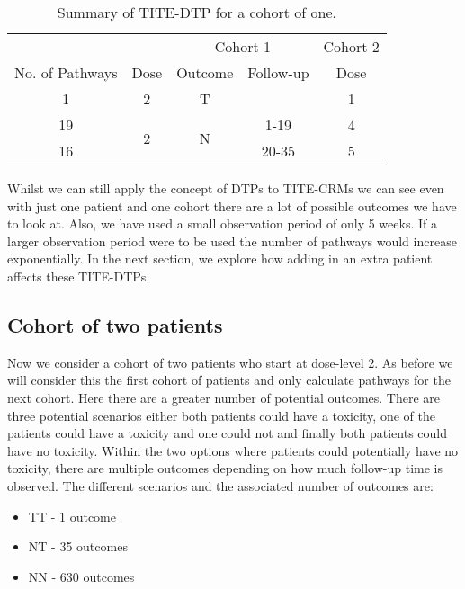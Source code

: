 \begin{table}[H]
	\centering
	\caption{Summary of TITE-DTP for a cohort of one.}
	\label{tab_tite-dtp:TITEDTP_c1_Sum}
	\begin{tabular}{ccccc}
		\hline
		\multicolumn{1}{l}{} &                 & \multicolumn{2}{c}{Cohort 1}   & Cohort 2 \\ 
		\cmidrule(l{3pt}r{3pt}){3-4} \cmidrule(l{3pt}r{3pt}){5-5}
		No. of Pathways & Dose                 & Outcome            & Follow-up & Dose     \\ \hline
		1				&  2                   & T                  &           & 1        \\ \hline
		19				&  \multirow{2}{*}{2}  & \multirow{2}{*}{N} & 1-19      & 4        \\
		16				&	 				   &                    & 20-35     & 5        \\ \hline
	\end{tabular}
\end{table}

Whilst we can still apply the concept of DTPs to TITE-CRMs we can see even with just one patient and one cohort there are a lot of possible outcomes we have to look at. Also, we have used a small observation period of only 5 weeks. If a larger observation period were to be used the number of pathways would increase exponentially. In the next section, we explore how adding in an extra patient affects these TITE-DTPs.  


\subsection{Cohort of two patients}
\label{tite-dtp:TITE-DTPs-c2}
Now we consider a cohort of two patients who start at dose-level 2. As before we will consider this the first cohort of patients and only calculate pathways for the next cohort. Here there are a greater number of potential outcomes. There are three potential scenarios either both patients could have a toxicity, one of the patients could have a toxicity and one could not and finally both patients could have no toxicity. Within the two options where patients could potentially have no toxicity, there are multiple outcomes depending on how much follow-up time is observed. The different scenarios and the associated number of outcomes are: 

\begin{itemize}
	\item TT - 1 outcome 
	\item NT - 35 outcomes 
	\item NN - 630 outcomes
\end{itemize}


